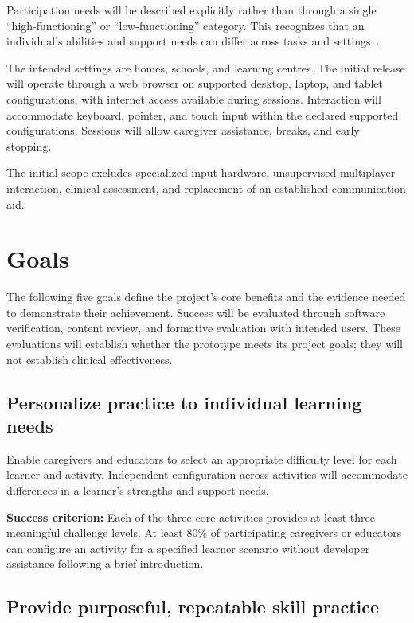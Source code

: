 \documentclass{article}
\begin{document}
Participation needs will be described explicitly rather than through a single
``high-functioning'' or ``low-functioning'' category. This recognizes that an
individual's abilities and support needs can differ across tasks and
settings~\citep{nasSupport}.

The intended settings are homes, schools, and learning centres. The initial
release will operate through a web browser on supported desktop, laptop, and
tablet configurations, with internet access available during sessions.
Interaction will accommodate keyboard, pointer, and touch input within the
declared supported configurations. Sessions will allow caregiver assistance,
breaks, and early stopping.

The initial scope excludes specialized input hardware, unsupervised multiplayer
interaction, clinical assessment, and replacement of an established
communication aid.

\section{Goals}
The following five goals define the project's core benefits and the evidence
needed to demonstrate their achievement. Success will be evaluated through
software verification, content review, and formative evaluation with intended
users. These evaluations will establish whether the prototype meets its project
goals; they will not establish clinical effectiveness.

\subsection{Personalize practice to individual learning needs}
\label{sec:personalize}

Enable caregivers and educators to select an appropriate difficulty level for
each learner and activity. Independent configuration across
activities will accommodate differences in a learner's strengths and support
needs.

\textbf{Success criterion:} Each of the three core activities provides at least
three meaningful challenge levels. At least 80\% of
participating caregivers or educators can configure an activity for a specified
learner scenario without developer assistance following a brief introduction.

\subsection{Provide purposeful, repeatable skill practice}
\end{document}
